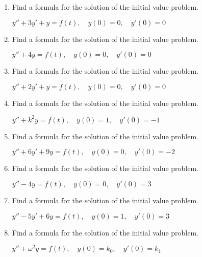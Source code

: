 \documentclass{ximera}
\begin{document}
\begin{problem}\label{exer:8.6.3}

\begin{enumerate}
\item Find a formula for the solution of the initial value problem.

$y''+3y'+y=f(t),\quad y(0)=0,\quad y'(0)=0$

\item Find a formula for the solution of the initial value problem.

$y''+4y=f(t),\quad y(0)=0,\quad y'(0)=0$

\item Find a formula for the solution of the initial value problem.

$y''+2y'+y=f(t),\quad y(0)=0,\quad y'(0)=0$

\item Find a formula for the solution of the initial value problem.

$y''+k^2y=f(t),\quad y(0)=1,\quad y'(0)=-1$

\item Find a formula for the solution of the initial value problem.

$y''+6y'+9y=f(t),\quad y(0)=0,\quad y'(0)=-2$

\item Find a formula for the solution of the initial value problem.

$y''-4y=f(t),\quad y(0)=0,\quad y'(0)=3$

\item Find a formula for the solution of the initial value problem.

$y''-5y'+6y=f(t),\quad y(0)=1,\quad y'(0)=3$

\item Find a formula for the solution of the initial value problem.

$y''+\omega^2y=f(t),\quad y(0)=k_0,\quad y'(0)=k_1$
\end{enumerate}
\end{problem}
\end{document}
